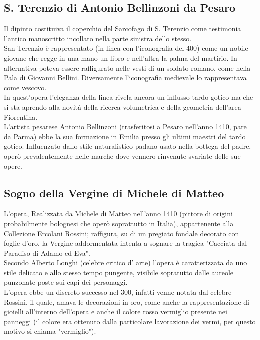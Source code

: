 \documentclass[hidelinks,12pt,a4paper]{article}
\begin{document}
\begin{flushleft}
			\subsection{S. Terenzio di Antonio Bellinzoni da Pesaro}
			Il dipinto costituiva il coperchio del Sarcofago di S. Terenzio come testimonia l’antico manoscritto incollato nella parte sinistra dello stesso.\\
			San Terenzio è rappresentato (in linea con l'iconografia del 400) come un nobile giovane che regge in una mano un libro e nell'altra la palma del martirio. In alternativa poteva essere raffigurato nelle vesti di un soldato romano, come nella Pala di Giovanni Bellini. Diversamente l’iconografia medievale lo rappresentava come vescovo.\\
			In quest'opera l'eleganza della linea rivela ancora un influsso tardo gotico ma che si sta aprendo alla novità della ricerca volumetrica e della geometria dell'area Fiorentina.\\
			L'artista pesarese Antonio Bellinzoni (trasferitosi a Pesaro nell'anno 1410, pare da Parma) ebbe la sua formazione in Emilia presso gli ultimi maestri del tardo gotico. Influenzato dallo stile naturalistico padano usato nella bottega del padre, operò prevalentemente nelle marche dove vennero rinvenute svariate delle sue opere.
	
			\subsection{Sogno della Vergine di Michele di Matteo}
			L'opera, Realizzata da Michele di Matteo nell'anno 1410 (pittore di origini probabilmente bolognesi che operò soprattutto in Italia), appartenente alla Collezione Ercolani Rossini; raffigura, su di un pregiato fondale decorato con foglie d'oro, la Vergine addormentata intenta a sognare la tragica "Cacciata dal Paradiso di Adamo ed Eva".\\
			Secondo Alberto Longhi (celebre critico d’ arte) l'opera è caratterizzata da uno stile delicato e allo stesso tempo pungente, visibile sopratutto dalle aureole punzonate poste sui capi dei personaggi.\\
			L'opera ebbe un discreto successo nel 300, infatti venne notata dal celebre Rossini, il quale, amava le decorazioni in oro, come anche la rappresentazione di gioielli all'interno dell'opera e anche il colore rosso vermiglio presente nei panneggi (il colore era ottenuto dalla particolare lavorazione dei vermi, per questo motivo si chiama "vermiglio").  
	

\end{flushleft}
\end{document}
